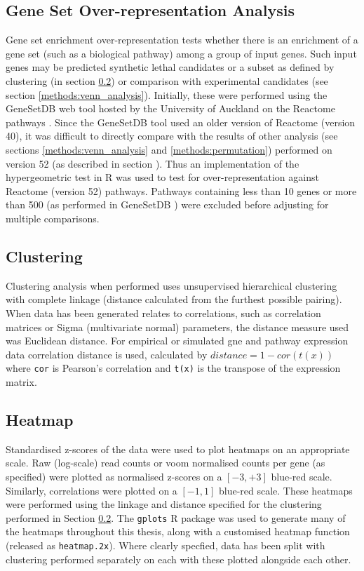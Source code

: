 \subsection{Gene Set Over-representation Analysis}
Gene set enrichment over-representation tests whether there is an enrichment of a gene set (such as a biological pathway) among a group of input genes. Such input genes may be predicted synthetic lethal candidates or a subset as defined by clustering (in section \ref{methods:clustering}) or comparison with experimental candidates (see section \ref{methods:venn_analysis}). Initially, these were performed using the GeneSetDB web tool \cite{genesetdb} hosted by the University of Auckland on the Reactome pathways \cite{reactome}. Since the GeneSetDB tool used an older version of Reactome (version 40), it was difficult to directly compare with the results of other analysis (see sections \ref{methods:venn_analysis} and \ref{methods:permutation}) performed on version 52 (as described in  section \label{methods:gene_set}). Thus an implementation of the hypergeometric test in R \cite{R_core} was used to test for over-representation against Reactome (version 52) pathways. Pathways containing less than 10 genes or more than 500 (as performed in GeneSetDB \cite{genesetdb}) were excluded before adjusting for multiple comparisons.

\subsection{Clustering} \label{methods:clustering}
Clustering analysis when performed uses unsupervised hierarchical clustering with complete linkage (distance calculated from the furthest possible pairing). When data has been generated relates to correlations, such as correlation matrices or Sigma (multivariate normal) parameters, the distance measure used was Euclidean distance. For empirical or simulated gne and pathway expression data correlation distance is used, calculated by $distance = 1 - cor(t(x))$ where \texttt{cor} is Pearson's correlation and \texttt{t(x)} is the transpose of the expression matrix. 

\subsection{Heatmap} \label{methods:heatmap}
Standardised z-scores of the data were used to plot heatmaps on an appropriate scale. Raw (log-scale) read counts or voom normalised counts per gene (as specified) were plotted  as normalised z-scores on a $[-3,+3]$ blue-red scale. Similarly, correlations were plotted on a $[-1,1]$ blue-red scale. These heatmaps were performed using the linkage and distance specified for the clustering performed in Section \ref{methods:clustering}. The \texttt{gplots} R package \cite{gplots} was used to generate many of the heatmaps throughout this thesis, along with a customised heatmap function (released as \texttt{heatmap.2x}). Where clearly specfied, data has been split with clustering performed separately on each with these plotted alongside each other.


